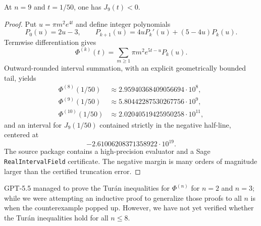 \begin{cxrefutation}
\begin{theorem}\label{thm:theta}
At $n=9$ and $t=1/50$, one has $J_9(t)<0$.
\end{theorem}
\begin{proof}
Put $u=\pi m^2e^{4t}$ and define integer polynomials
\[
P_0(u)=2u-3,\qquad P_{k+1}(u)=4uP_k'(u)+(5-4u)P_k(u).
\]
Termwise differentiation gives
\[
\Phi^{(k)}(t)=\sum_{m\ge1}\pi m^2e^{5t-u}P_k(u).
\]
Outward-rounded interval summation, with an explicit geometrically bounded tail, yields
\begin{align*}
\Phi^{(8)}(1/50)&\approx 2.95940368409056694\cdot10^8,\\
\Phi^{(9)}(1/50)&\approx 5.80442287530267756\cdot10^9,\\
\Phi^{(10)}(1/50)&\approx 2.02040519425950258\cdot10^{11},
\end{align*}
and an interval for $J_9(1/50)$ contained strictly in the negative half-line, centered at
\[
-2.61006208371358922\cdot10^{19}.
\]
The source package contains a high-precision evaluator and a Sage \texttt{RealIntervalField} certificate.  The negative margin is many orders of magnitude larger than the certified truncation error.
\end{proof}

\begin{remark}
  GPT-5.5 managed to prove the Tur\'an inequalities for $\Phi^{(n)}$ for $n=2$ and $n=3$; while we were attempting an inductive proof to generalize those proofs to all $n$ is when the counterexample popped up. However, we have not yet verified whether the Tur\'an inequalities hold for all $n \le 8$.
\end{remark}
\end{cxrefutation}



